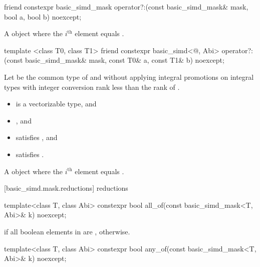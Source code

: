 \begin{itemdecl}
friend constexpr basic_simd_mask operator?:(const basic_simd_mask& mask, bool a, bool b) noexcept;
\end{itemdecl}

\begin{itemdescr}
  \pnum\returns
  A  object where the $i^\text{th}$ element equals  \foralli.
\end{itemdescr}

\begin{itemdecl}
template <class T0, class T1>
  friend constexpr basic_simd<@\seebelow@, Abi>
    operator?:(const basic_simd_mask& mask, const T0& a, const T1& b) noexcept;
\end{itemdecl}

\begin{itemdescr}
  \pnum Let  be the common type of  and  without
  applying integral promotions on integral types with integer conversion rank
  less than the rank of .

  \pnum\constraints
  \begin{itemize}
    \item {} is a vectorizable type, and
    \item {}, and
    \item {} satisfies , and
    \item {} satisfies .
  \end{itemize}

  \pnum\returns
  A  object where the $i^\text{th}$ element equals  \foralli.
\end{itemdescr}

[basic_simd.mask.reductions]{ reductions}

\begin{itemdecl}
template<class T, class Abi> constexpr bool all_of(const basic_simd_mask<T, Abi>& k) noexcept;
\end{itemdecl}

\begin{itemdescr}
  \pnum\returns
   if all boolean elements in  are ,  otherwise.
\end{itemdescr}

\begin{itemdecl}
template<class T, class Abi> constexpr bool any_of(const basic_simd_mask<T, Abi>& k) noexcept;
\end{itemdecl}

